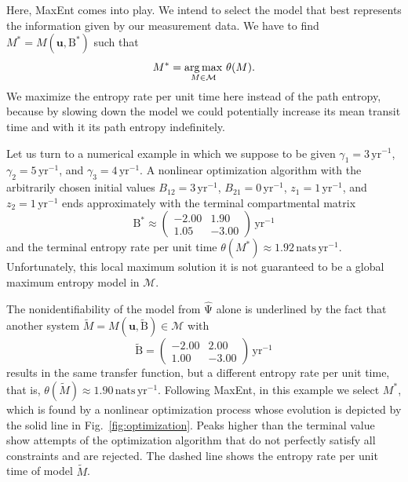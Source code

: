 \documentclass[smallextended]{svjour3}
\renewcommand{\tens}[1]{\mathrm{#1}}
\renewcommand{\vec}[1]{\mathbf{#1}}
\newcommand{\yr}{\mathrm{yr}}
\newcommand{\nats}{\mathrm{nats}}
\newcommand{\ie}{that is}
\begin{document}
	Here, MaxEnt comes into play.
	We intend to select the model that best represents the information given by our measurement data.
	We have to find $M^\ast=M(\vec{u},\tens{B}^\ast)$ such that
	\begin{equation}
		M^\ast = \operatornamewithlimits{arg\,max}\limits_{M\in\mathcal{M}}\,\theta(M).
	\end{equation}
	We maximize the entropy rate per unit time here instead of the path entropy, because by slowing down the model we could potentially increase its mean transit time and with it its path entropy indefinitely.
	
	Let us turn to a numerical example in which we suppose to be given $\gamma_1=3\,\yr^{-1}$, $\gamma_2=5\,\yr^{-1}$, and $\gamma_3=4\,\yr^{-1}$.
	A nonlinear optimization algorithm with the arbitrarily chosen initial values $B_{12}=3\,\yr^{-1}$, $B_{21}=0\,\yr^{-1}$, $z_1=1\,\yr^{-1}$, and $z_2=1\,\yr^{-1}$ ends approximately with the terminal compartmental matrix
	\begin{equation}
		\tens{B}^\ast \approx \begin{pmatrix} -2.00 & 1.90 \\ 1.05 & -3.00 \end{pmatrix}\,\yr^{-1}
	\end{equation}
	and the terminal entropy rate per unit time $\theta(M^\ast) \approx 1.92\,\nats\,\yr^{-1}$.
	Unfortunately, this local maximum solution it is not guaranteed to be a global maximum entropy model in $\mathcal{M}$.
	
	The nonidentifiability of the model from $\widehat{\tens{\Psi}}$ alone is underlined by the fact that another system $\widetilde{M}=M(\vec{u},\widetilde{\tens{B}})\in\mathcal{M}$ with
	\begin{equation}
		\widetilde{\tens{B}} =
		\begin{pmatrix}
			-2.00 & 2.00 \\ 1.00 & -3.00
		\end{pmatrix}
		\,\yr^{-1}
	\end{equation}
	results in the same transfer function, but a different entropy rate per unit time, \ie, $\theta(\widetilde{M}) \approx 1.90\,\nats\,\yr^{-1}$.
	Following MaxEnt, in this example we select $M^\ast$, which is found by a nonlinear optimization process whose evolution is depicted by the solid line in Fig.~\ref{fig:optimization}.
	Peaks higher than the terminal value show attempts of the optimization algorithm that do not perfectly satisfy all constraints and are rejected.
	The dashed line shows the entropy rate per unit time of model $\widetilde{M}$.
\end{document}
